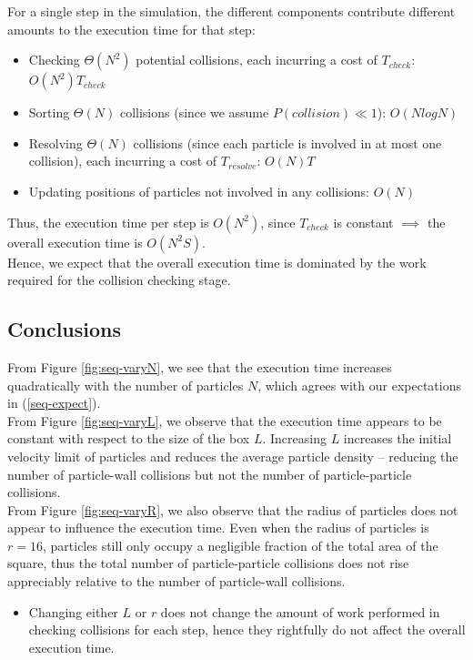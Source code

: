 \documentclass[12pt]{article}
\begin{document}
For a single step in the simulation, the different components contribute different amounts to the execution time for that step:
\begin{itemize}
	\item Checking $\Theta(N^2)$ potential collisions, each incurring a cost of $T_{check}$: $O(N^2)T_{check}$
	\item Sorting $\Theta(N)$ collisions (since we assume $P(collision) \ll 1$): $O(N log N)$
	\item Resolving $\Theta(N)$ collisions (since each particle is involved in at most one collision), each incurring a cost of $T_{resolve}$: $O(N)T$
	\item Updating positions of particles not involved in any collisions: $O(N)$
\end{itemize}

Thus, the execution time per step is $O(N^2)$, since $T_{check}$ is constant $\implies$ the overall execution time is $O(N^2S)$. \\

Hence, we expect that the overall execution time is dominated by the work required for the collision checking stage.

\subsection{Conclusions}

From Figure \ref{fig:seq-varyN}, we see that the execution time increases quadratically with the number of particles $N$, which agrees with our expectations in (\ref{seq-expect}). \\

From Figure \ref{fig:seq-varyL}, we observe that the execution time appears to be constant with respect to the size of the box $L$. Increasing $L$ increases the initial velocity limit of particles and reduces the average particle density – reducing the number of particle-wall collisions but not the number of particle-particle collisions. \\

From Figure \ref{fig:seq-varyR}, we also observe that the radius of particles does not appear to influence the execution time. Even when the radius of particles is $r=16$, particles still only occupy a negligible fraction of the total area of the square, thus the total number of particle-particle collisions does not rise appreciably relative to the number of particle-wall collisions. \\
\begin{itemize}
	\item Changing either $L$ or $r$ does not change the amount of work performed in checking collisions for each step, hence they rightfully do not affect the overall execution time.
\end{itemize}
\end{document}
